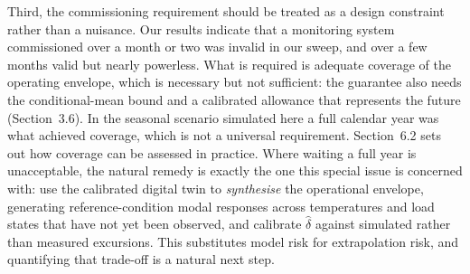 \documentclass[12pt,a4paper]{article}
\newcommand{\rev}[1]{#1}
\newcommand{\rev}[1]{{\color{revcol}#1}}
\newcommand{\rtwo}[1]{#1}
\newcommand{\rtwo}[1]{{\color{revcolb}#1}}
\begin{document}
Third, the commissioning requirement should be treated as a design constraint rather than a nuisance. Our results indicate that a monitoring system commissioned over a month or two was invalid in our sweep, and over a few months valid but nearly powerless. \color{revcolb}\rev{What is required is adequate coverage of the operating envelope, which is necessary but not sufficient: the guarantee also needs the conditional-mean bound and a calibrated allowance that represents the future (Section~3.6).\color{revcol} \rtwo{In the seasonal scenario simulated here a full calendar year was what achieved coverage, which is not a universal requirement.} Section~6.2 sets out how coverage can be assessed in practice.} Where waiting a full year is unacceptable, the natural remedy is exactly the one this special issue is concerned with: use the calibrated digital twin to \emph{synthesise} the operational envelope, generating reference-condition modal responses across temperatures and load states that have not yet been observed, and calibrate $\hat\delta$ against simulated rather than measured excursions. This substitutes model risk for extrapolation risk, and quantifying that trade-off is a natural next step.
\end{document}
